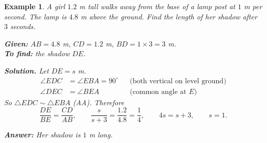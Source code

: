 \documentclass[11pt,a4paper]{article}
\theoremstyle{brand}
\theoremstyle{branddef}
\newtheorem{example}{Example}[section]
\newcommand{\tr}{\triangle}
\newcommand{\ramark}[3]{\coordinate (ra1) at ($(#1)!2mm!(#2)$);\coordinate (ra2) at ($(#1)!2mm!(#3)$);\draw[thin] (ra1) -- ($(ra1)+(ra2)-(#1)$) -- (ra2);}
\newcommand{\slab}[4][0.5]{\path (#2) -- (#3) node[pos=#1, auto=right, inner sep=2.5pt] {#4};}
\begin{document}
\begin{example}
A girl $1.2$ m tall walks away from the base of a lamp post at $1$ m per second. The lamp is $4.8$ m above the ground. Find the length of her shadow after $3$ seconds.

\begin{center}\end{center}

\textbf{Given:} $AB=4.8$ m, $CD=1.2$ m, $BD=1\times3=3$ m.\\
\textbf{To find:} the shadow $DE$.

\textbf{Solution.} Let $DE=s$ m.
\[
\begin{aligned}
\angle EDC&=\angle EBA=90^\circ &&\text{(both vertical on level ground)}\\
\angle DEC&=\angle BEA &&\text{(common angle at $E$)}
\end{aligned}
\]
So $\tr EDC\sim\tr EBA$ (AA). Therefore
\[
\dfrac{DE}{BE}=\dfrac{CD}{AB},\qquad \dfrac{s}{s+3}=\dfrac{1.2}{4.8}=\dfrac14,\qquad 4s=s+3,\qquad s=1.
\]

\textbf{Answer:} Her shadow is $1$ m long.
\end{example}
\end{document}
